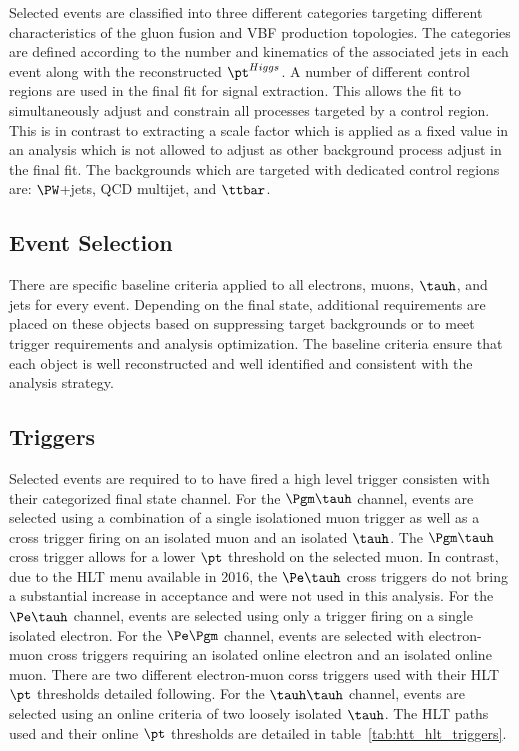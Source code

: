 Selected events are classified into three different categories targeting different characteristics
of the gluon fusion and VBF production topologies. The categories are defined according to the
number and kinematics of the associated jets in each event along with the reconstructed $\pt^{Higgs}$.
A number of different control regions are used in the final fit for signal extraction. This allows
the fit to simultaneously adjust and constrain all processes targeted by a control region. This is in
contrast to extracting a scale factor which is applied as a fixed value in an analysis which is not
allowed to adjust as other background process adjust in the final fit. The backgrounds which are
targeted with dedicated control regions are: $\PW$+jets, QCD multijet, and $\ttbar$.



\subsection{Event Selection}

There are specific baseline criteria applied to all electrons, muons, $\tauh$, and jets for every
event. Depending on the final state, additional requirements are placed on these objects based
on suppressing target backgrounds or to meet trigger requirements and analysis optimization. The baseline criteria ensure
that each object is well reconstructed and well identified and consistent with the analysis
strategy. 

\subsection{Triggers}
Selected events are required to to have fired a high level trigger consisten with their categorized final
state channel. For the $\Pgm\tauh$ channel, events are selected using a combination
of a single isolationed muon trigger as well as a cross trigger firing on an isolated muon and
an isolated $\tauh$. The $\Pgm\tauh$ cross trigger allows for a lower $\pt$ threshold
on the selected muon. In contrast, due to the HLT menu available in 2016, the $\Pe\tauh$ cross triggers
do not bring a substantial increase in acceptance and were not used in this analysis.
For the $\Pe\tauh$ channel, events are selected using only a trigger firing on a 
single isolated electron. For the $\Pe\Pgm$ channel, events are selected with electron-muon cross
triggers requiring an isolated online electron and an isolated online muon. There are two 
different electron-muon corss triggers used with their HLT $\pt$ thresholds detailed following.
For the $\tauh\tauh$ channel, events are selected using an online criteria of two loosely isolated $\tauh$. 
The HLT paths used and their online $\pt$ thresholds are detailed in table~\ref{tab:htt_hlt_triggers}.

